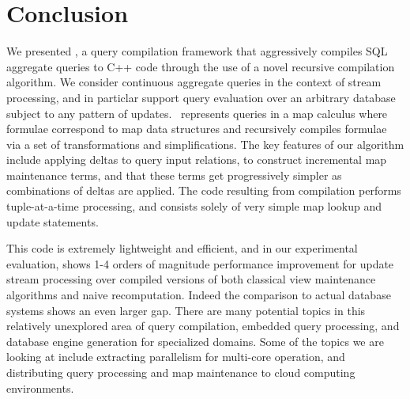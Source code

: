 \section{Conclusion}
We presented \compiler, a query compilation framework that aggressively compiles
SQL aggregate queries to C++ code through the use of a novel recursive
compilation algorithm. We consider continuous aggregate queries in the context
of stream processing, and in particlar support query evaluation over an
arbitrary database subject to any pattern of updates. \compiler\ represents
queries in a map calculus where formulae correspond to map data structures and
recursively compiles formulae via a set of transformations and simplifications.
The key features of our algorithm include applying deltas to query input
relations, to construct incremental map maintenance terms, and that these terms
get progressively simpler as combinations of deltas are applied. The code
resulting from compilation performs tuple-at-a-time processing, and consists
solely of very simple map lookup and update statements.

This code is extremely lightweight and efficient, and in our experimental
evaluation, shows 1-4 orders of magnitude performance improvement for update
stream processing over compiled versions of both classical view maintenance
algorithms and naive recomputation. Indeed the comparison to actual database
systems shows an even larger gap.
There are many potential topics in this relatively unexplored area of
query compilation, embedded query processing, and database engine generation for
specialized domains. Some of the topics we are looking at include extracting
parallelism for multi-core operation, and distributing query processing and map
maintenance to cloud computing environments.